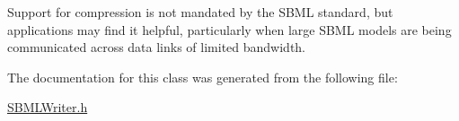 Support for compression is not mandated by the S\+B\+ML standard, but applications may find it helpful, particularly when large S\+B\+ML models are being communicated across data links of limited bandwidth. 

The documentation for this class was generated from the following file\+:\begin{DoxyCompactItemize}
\item 
\hyperlink{_s_b_m_l_writer_8h}{S\+B\+M\+L\+Writer.\+h}\end{DoxyCompactItemize}
